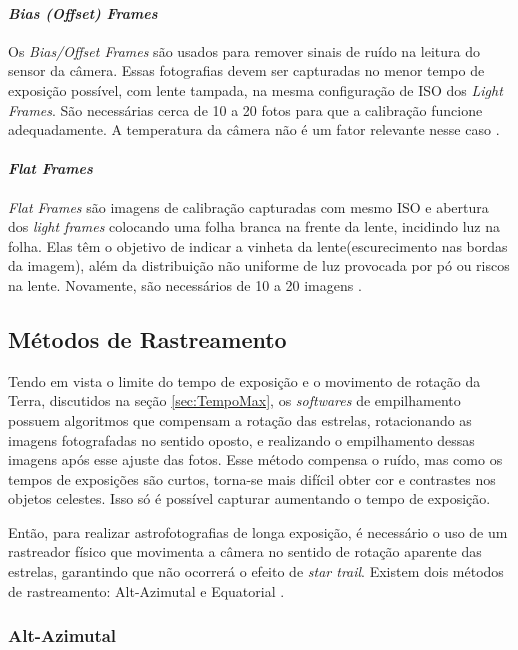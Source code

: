 \paragraph{\textit{Bias (Offset) Frames}}

Os \textit{Bias/Offset Frames} são usados para remover sinais de ruído na leitura do sensor da câmera. Essas fotografias devem ser capturadas no menor tempo de exposição possível, com lente tampada, na mesma configuração de ISO dos \textit{Light Frames}. São necessárias cerca de 10 a 20 fotos para que a calibração funcione adequadamente. A temperatura da câmera não é um fator relevante nesse caso \cite{man:deepskystackerfaq}.


\paragraph{\textit{Flat Frames}}
\textit{Flat Frames} são imagens de calibração capturadas com mesmo ISO e abertura dos \textit{light frames} colocando uma folha branca na frente da lente, incidindo luz na folha. Elas têm o objetivo de indicar a vinheta da lente(escurecimento nas bordas da imagem), além da distribuição não uniforme de luz provocada por pó ou riscos na lente. Novamente, são necessários de 10 a 20 imagens
\cite{man:deepskystackerfaq}.


\subsection{Métodos de Rastreamento}

Tendo em vista o limite do tempo de exposição e o movimento de rotação da Terra, discutidos na seção \ref{sec:TempoMax}, os \textit{softwares} de empilhamento possuem algoritmos que compensam a rotação das estrelas, rotacionando as imagens fotografadas no sentido oposto, e realizando o empilhamento dessas imagens após esse ajuste das fotos. Esse método compensa o ruído, mas como os tempos de exposições são curtos, torna-se mais difícil obter cor e contrastes nos objetos celestes. Isso só é possível capturar aumentando o tempo de exposição. 

Então, para realizar astrofotografias de longa exposição, é necessário o uso de um rastreador físico que movimenta a câmera no sentido de rotação aparente das estrelas, garantindo que não ocorrerá o efeito de \textit{star trail}. Existem dois métodos de rastreamento: Alt-Azimutal e Equatorial \cite{book:bbcsky}.

\subsubsection{Alt-Azimutal}

